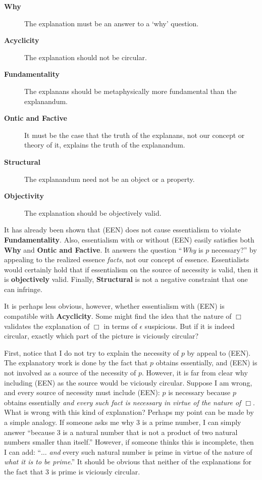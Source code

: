\documentclass[12pt]{article}
\begin{document}
\begin{description}
\item[\textbf{Why}] The explanation must be an answer to a `why' question. 
\item[\textbf{Acyclicity}] The explanation should not be circular. 
\item[\textbf{Fundamentality}] The explanans should be metaphysically more fundamental than the explanandum. 
\item[\textbf{Ontic and Factive}] It must be the case that the truth of the explanans, not our concept or theory of it, explains the truth of the explanandum. 
\item[\textbf{Structural}] The explanandum need not be an object or a property. 
\item[\textbf{Objectivity}] The explanation should be objectively valid.  
\end{description}
It has already been shown that (EEN) does not cause essentialism to violate \textbf{Fundamentality}. Also, essentialism with or without (EEN) easily satisfies both \textbf{Why} and \textbf{Ontic and Factive}. It answers the question ``\textit{Why} is $p$ necessary?'' by appealing to the realized essence \textit{facts}, not our concept of essence. Essentialists would certainly hold that if essentialism on the source of necessity is valid, then it is \textbf{objectively} valid. Finally, \textbf{Structural} is not a negative constraint that one can infringe. 
\par
It is perhaps less obvious, however, whether essentialism with (EEN) is compatible with \textbf{Acyclicity}. Some might find the idea that the nature of $\Box$ validates the explanation of $\Box$ in terms of $\epsilon$ suspicious. But if it is indeed circular, exactly which part of the picture is viciously circular?
\par
First, notice that I do not try to explain the necessity of $p$ by appeal to (EEN). The explanatory work is done by the fact that $p$ obtains essentially, and (EEN) is not involved as a source of the necessity of $p$. However, it is far from clear why including (EEN) as the source would be viciously circular. Suppose I am wrong, and every source of necessity must include (EEN): $p$ is necessary because $p$ obtains essentially \textit{and every such fact is necessary in virtue of the nature of $\Box$}. What is wrong with this kind of explanation? Perhaps my point can be made by a simple analogy. If someone asks me why 3 is a prime number, I can simply answer ``because 3 is a natural number that is not a product of two natural numbers smaller than itself.'' However, if someone thinks this is incomplete, then I can add: ``$\dots$ \textit{and} every such natural number is prime in virtue of the nature of \textit{what it is to be prime}.'' It should be obvious that neither of the explanations for the fact that 3 is prime is viciously circular. 
\end{document}

